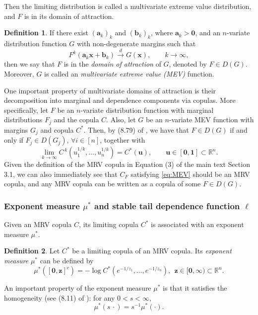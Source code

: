 \documentclass[12pt]{article}
\theoremstyle{plain}
\theoremstyle{plain}
\theoremstyle{definition}
\newtheorem{defn}{Definition}[section]
\newcommand{\R}{\mathbb{R}}
\begin{document}
Then the limiting distribution is called a multivariate extreme value distribution, and $F$ is in its domain of attraction. 
\begin{defn}
	If there exist $(\mathbf{a}_k)_k$ and $(\mathbf{b}_k)_k$, where $\mathbf{a}_k > \mathbf{0}$, and an $n$-variate distribution function $G$ with non-degenerate
	margins such that
	\begin{equation*} %
		F^k(\mathbf{a}_k \mathbf{x} + \mathbf{b}_k)
		\xrightarrow{d} G(\mathbf{x}),
		\qquad k \to \infty ,
	\end{equation*}
	then  we say that $F$ is in the {\it domain of attraction} of $G$,
	denoted by $F \in D(G)$. Moreover, $G$ is called an {\it multivariate extreme value (MEV)} function.  
\end{defn}

One important property of multivariate domains of attraction is their decomposition into marginal and dependence components via copulas. More specifically, let $F$ be an $n$-variate distribution function with marginal distributions $F_j$ and the copula $C$. Also, let $G$ be an $n$-variate MEV function with margins $G_j$ and copula $C^*$.  Then, by ({8.79}) of , we have that $F\in D(G)$ if and only if $F_j \in D(G_j)$, $\forall i\in [n]$, together with
\begin{equation} \label{eq:MEV}
	\lim_{k\to\infty}
	C^{\,k}(u_1^{1/k},\ldots,u_n^{1/k})
	=
	C^*(\mathbf{u}),
	\qquad
	\mathbf{u}\in[\mathbf{0},\mathbf{1}]\subset\R^n .
\end{equation} 
Given the definition of the MRV copula in Equation (3) of the main text Section 3.1, we can also immediately see that $C_F$ satisfying \eqref{eq:MEV} should be an MRV copula, and any MRV copula can be written as a copula of some $F\in D(G)$. 

\subsubsection{Exponent measure $\mu^*$ and stable tail dependence function $\ell$}
Given an MRV copula $C$, its limiting copula $C^*$ is associated with an exponent measure $\mu^*$.
\begin{defn} \label{def:0127-1}
	Let $C^*$ be a limiting copula of an MRV copula. Its \emph{exponent measure} $\mu^{*}$ can be defined by
	\begin{equation}\label{eq:0127-2}
		\mu^{*}\left([\mathbf{0},\mathbf{z}]^c\right)=-\log C^{*}\left(e^{-1/z_1},\dots,e^{-1/z_n}\right), 
		~~\mathbf{z}\in[\mathbf{0},\bm{\infty})\subset\R^n.
	\end{equation}
\end{defn}
An important property of the exponent measure $\mu^*$ is that it satisfies the homogeneity (see (8.11) of ): for any $0<s<\infty$,
\begin{equation}
	\label{eq:mu-homogeneity}
	\mu^{*}(s\,\cdot)=s^{-1}\mu^{*}(\cdot).
\end{equation}
\end{document}

